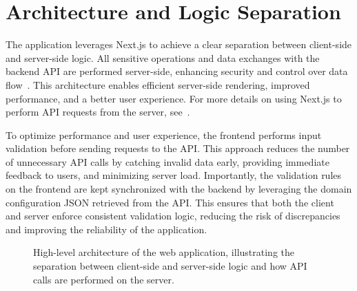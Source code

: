 \section{Architecture and Logic Separation}

The application leverages Next.js to achieve a clear separation between client-side and server-side logic. All sensitive operations and data exchanges with the backend API are performed server-side, enhancing security and control over data flow~\cite{nextjs-server-client-components,nextjs-data-fetching}. This architecture enables efficient server-side rendering, improved performance, and a better user experience. For more details on using Next.js to perform API requests from the server, see~\cite{auth0-nextjs-server-actions}.

To optimize performance and user experience, the frontend performs input validation before sending requests to the API. This approach reduces the number of unnecessary API calls by catching invalid data early, providing immediate feedback to users, and minimizing server load. Importantly, the validation rules on the frontend are kept synchronized with the backend by leveraging the domain configuration JSON retrieved from the API. This ensures that both the client and server enforce consistent validation logic, reducing the risk of discrepancies and improving the reliability of the application.

\begin{figure}[H]
    \begin{center}
    \end{center}
    \caption{High-level architecture of the web application, illustrating the separation between client-side and server-side logic and how API calls are performed on the server.}
    \label{fig:webapp_simple_architecture}
\end{figure}


